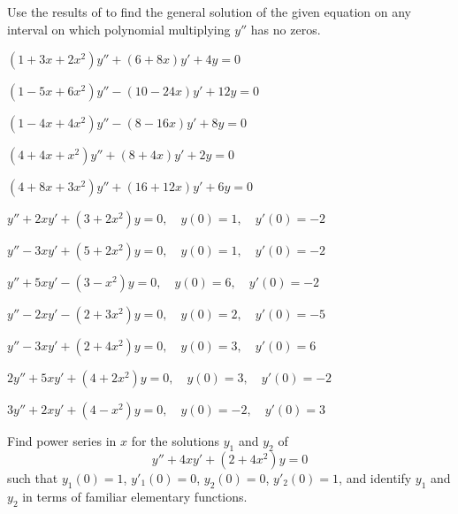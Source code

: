 \begin{exerciselist}
\item\label{exer:7.3.31}Use the results of  to find the general solution
of the given equation on any interval on which polynomial multiplying
$y''$ has no zeros.
\begin{alist}
\item $(1+3x+2x^2)y''+(6+8x)y'+4y=0$
\item $(1-5x+6x^2)y''-(10-24x)y'+12y=0$
\item $(1-4x+4x^2)y''-(8-16x)y'+8y=0$
\item $(4+4x+x^2)y''+(8+4x)y'+2y=0$
\item $(4+8x+3x^2)y''+(16+12x)y'+6y=0$
\end{alist}



\item\label{exer:7.3.32}\Cex
$y''+2xy'+(3+2x^2)y=0,\quad y(0)=1,\quad y'(0)=-2$


\item\label{exer:7.3.33}\Cex
$y''-3xy'+(5+2x^2)y=0,\quad y(0)=1,\quad y'(0)=-2$


\item\label{exer:7.3.34}\Cex
$y''+5xy'-(3-x^2)y=0,\quad y(0)=6,\quad y'(0)=-2$


\item\label{exer:7.3.35}\Cex
$y''-2xy'-(2+3x^2)y=0,\quad y(0)=2,\quad y'(0)=-5$


\item\label{exer:7.3.36}\Cex
$y''-3xy'+(2+4x^2)y=0,\quad y(0)=3,\quad y'(0)=6$


\item\label{exer:7.3.37}\Cex
$2y''+5xy'+(4+2x^2)y=0,\quad y(0)=3,\quad y'(0)=-2$

\item\label{exer:7.3.38}\Cex
$3y''+2xy'+(4-x^2)y=0,\quad y(0)=-2,\quad y'(0)=3$


\item\label{exer:7.3.39}Find power series in $x$ for the solutions $y_1$
 and $y_2$ of
\[
y''+4xy'+(2+4x^2)y=0
\]
such that $y_1(0)=1$,\;  $y'_1(0)=0$,\;  $y_2(0)=0$,\;
 $y'_2(0)=1$, and identify $y_1$  and $y_2$ in terms of familiar elementary
functions.




\end{exerciselist}
